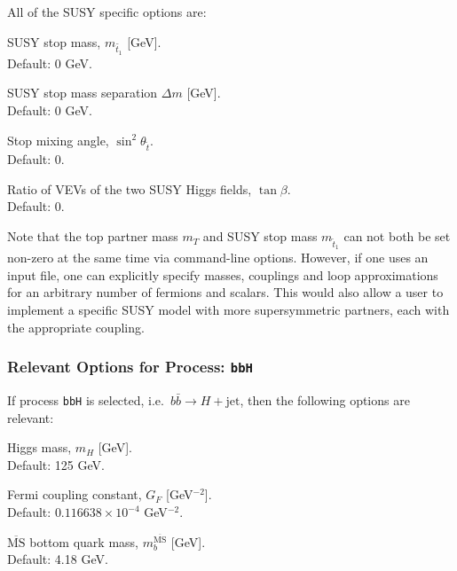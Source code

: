 \documentclass[12pt]{article}
\begin{document}
\noindent All of the SUSY specific options are: 
\begin{description}[labelindent=\parindent, labelwidth =\widthof{\bfseries9999999999999999999999}, leftmargin = !] 
	\item[\texttt{--mst <value>}] SUSY stop mass, $m_{\tilde{t_1}}$ [GeV]. \\ Default: 0 GeV. 
	\item[\texttt{--delta <value>}] SUSY stop mass separation $\Delta m$ [GeV]. \\ Default: 0 GeV. 
	\item[\texttt{--sth2 <value>}] Stop mixing angle, $\sin^2 \theta_{\tilde{t}}$. \\ Default: 0. 
	\item[\texttt{--tbeta <value>}] Ratio of VEVs of the two SUSY Higgs fields, $\tan\beta$. \\ Default: 0. 
\end{description}
Note that the top partner mass $m_{T}$ and SUSY stop mass
$m_{\tilde{t}_1}$ can not both be set non-zero at the same time via
command-line options. However, if one uses an input file, one can
explicitly specify masses, couplings and loop approximations for an
arbitrary number of fermions and scalars. This would also allow a user
to implement a specific SUSY model with more supersymmetric partners,
each with the appropriate coupling.

\subsubsection{Relevant Options for Process: \texttt{bbH}}
If process \texttt{bbH} is selected, i.e.\
$
	b\bar{b} \rightarrow H + \text{jet}
$, then the following options are relevant: 
\begin{description}[labelindent=\parindent, labelwidth =\widthof{\bfseries9999999999999999999999}, leftmargin = !] 
	\item[\texttt{--mH <value>}] Higgs mass, $m_H$ [GeV]. \\ Default: 125 GeV. 
	\item[\texttt{--GF <value>}] Fermi coupling constant, $G_F$ [GeV$^{-2}$]. \\ Default: $0.116638 \times 10^{-4}$ GeV$^{-2}$. 
	\item[\texttt{--mbmb <value>}] $\overline{\text{MS}}$ bottom quark mass, $m_b^{\overline{\text{MS}}}$ [GeV]. \\ Default: 4.18 GeV. 
\end{description}
\end{document}
